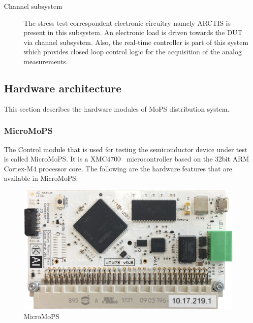 \begin{description}
\item[Channel subsystem] The stress test correspondent electronic circuitry namely \acrshort{ARCTIS} is present in this subsystem. An electronic load is driven towards the \acrshort{DUT} via channel subsystem. Also, the real-time controller is part of this system which provides closed loop control logic for the acquisition of the analog measurements.  
\end{description}

\subsection{Hardware architecture}
This section describes the hardware modules of MoPS distribution system.
\subsubsection{MicroMoPS}\label{sec:uMoPS}
The Control module that is used for testing the semiconductor device under test is called MicroMoPS. 
It is a XMC4700~\cite{xmc4700rm2016-RefXMCDatasheet} microcontroller based on the 32bit ARM Cortex-M4 processor core. 
The following are the hardware features that are available in MicroMoPS:

\begin{figure}[htb]
		\centering
		\includegraphics[trim=0 0 0 0, clip, width=120mm]{images/Umopsv5.JPG}
		\caption{MicroMoPS}
		\label{fig:uMoPS}
\end{figure}

